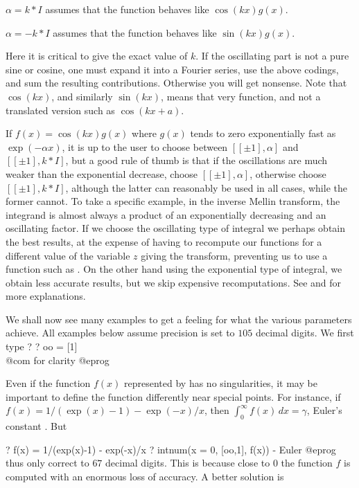 \item $\alpha=k * I$ assumes that the function behaves like $\cos(kx)g(x)$.

\item $\alpha=-k* I$ assumes that the function behaves like $\sin(kx)g(x)$.

\noindent Here it is critical to give the exact value of $k$. If the
oscillating part is not a pure sine or cosine, one must expand it into a
Fourier series, use the above codings, and sum the resulting contributions.
Otherwise you will get nonsense. Note that $\cos(kx)$, and similarly
$\sin(kx)$, means that very function, and not a translated version such as
$\cos(kx+a)$.

 If $f(x)=\cos(kx)g(x)$ where $g(x)$ tends to zero
exponentially fast as $\exp(-\alpha x)$, it is up to the user to choose
between $[[\pm1],\alpha]$ and $[[\pm1],k* I]$, but a good rule of thumb is that
if the oscillations are much weaker than the exponential decrease, choose
$[[\pm1],\alpha]$, otherwise choose $[[\pm1],k* I]$, although the latter can
reasonably be used in all cases, while the former cannot. To take a specific
example, in the inverse Mellin transform, the integrand is almost always a
product of an exponentially decreasing and an oscillating factor. If we
choose the oscillating type of integral we perhaps obtain the best results,
at the expense of having to recompute our functions for a different value of
the variable $z$ giving the transform, preventing us to use a function such
as . On the other hand using the exponential type of
integral, we obtain less accurate results, but we skip expensive
recomputations. See  and  for more
explanations.

\smallskip

We shall now see many examples to get a feeling for what the various
parameters achieve. All examples below assume precision is set to $105$
decimal digits. We first type
\bprog
? 
? oo = [1]  \\@com for clarity
@eprog

 Even if the function $f(x)$ represented
by  has no singularities, it may be important to define the
function differently near special points. For instance, if $f(x) = 1
/(\exp(x)-1) - \exp(-x)/x$, then $\int_0^\infty f(x)\,dx=\gamma$, Euler's
constant . But

\bprog
? f(x) = 1/(exp(x)-1) - exp(-x)/x
? intnum(x = 0, [oo,1],  f(x)) - Euler
@eprog\noindent
thus only correct to $67$ decimal digits. This is because close to $0$ the
function $f$ is computed with an enormous loss of accuracy.
A better solution is


